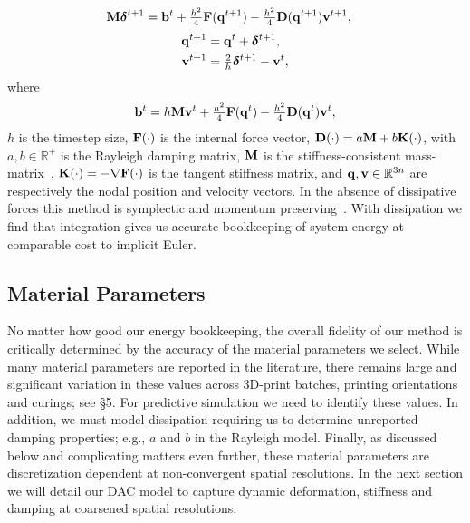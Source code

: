 \begin{align}
\vc M \vr \delta^{t+1} &= \vc b^t +  \tfrac{h^2}{4} \vc F(\vc q^{t+1}) -\tfrac{h^2}{4} \vc D(\vc q^{t+1}) \vc v^{t+1},
\label{eq:newmark_free}
%
\end{align}
\begin{align}
\begin{split}
\mathbf {q}^{t+1} &= \mathbf {q}^t + \bm{\delta}^{t+1},\\
\mathbf {v}^{t+1} &= \tfrac{2}{h} \bm{\delta}^{t+1} - \mathbf {v}^t,
\end{split}
\label{eq:newmark_free_update}
\end{align}
where
\begin{align}
\mathbf {b}^t = h \mathbf {M} \mathbf {v}^t + \tfrac{h^2}{4} \mathbf {F}( \mathbf {q}^t) -\tfrac{h^2}{4} \mathbf {D}( \mathbf {q}^t) \mathbf {v}^t,
\label{eq:newmark_predictor}
\end{align}
$h$ is the timestep size, $\mathbf {F}(\cdot)$ is the internal force vector, $\mathbf {D}(\cdot) = a \mathbf {M} + b \mathbf {K}(\cdot)$, 
with $a,b \in \mathbb{R}^+$ is the Rayleigh damping matrix, $\mathbf {M}$ is the stiffness-consistent mass-matrix~\citep{Belytschko:2013tz},
$\mathbf {K}(\cdot) = -\nabla \mathbf {F}(\cdot)$ is the tangent stiffness matrix, 
and $\mathbf {q}, \mathbf {v} \in \mathbb{R}^{3n}$ are respectively the nodal position and velocity vectors. In the absence of dissipative forces this method is symplectic and momentum preserving~\citep{Kane:2000dw}.
With dissipation we find that integration gives us accurate bookkeeping of system energy at comparable cost to implicit Euler. 

\subsection{Material Parameters}
No matter how good our energy bookkeeping, the overall fidelity of our method is critically determined by the accuracy of the material parameters we select. While many material parameters are reported in the literature, there remains large and significant variation in these values across 3D-print batches, printing orientations and curings; see \S5.
For predictive simulation we need to identify these values. In addition, we must model dissipation requiring us to determine unreported damping properties; e.g., $a$ and $b$ in the Rayleigh model. Finally, as discussed below and complicating matters even further, these material parameters are discretization dependent at non-convergent spatial resolutions. In the next section we will detail our DAC model to capture dynamic deformation, stiffness and damping at coarsened spatial resolutions.

